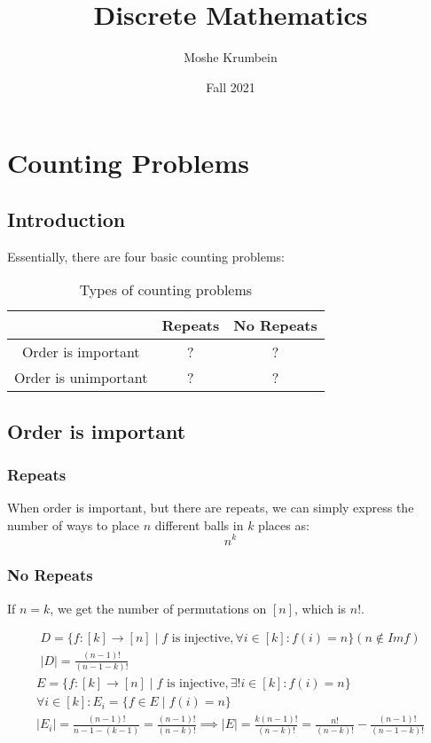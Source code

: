 \documentclass[00_complete]{subfiles}
\title{Discrete Mathematics}
\author{Moshe Krumbein}
\date{Fall 2021}
\begin{document}
\setcounter{chapter}{4}
\chapter{Counting Problems}

\section{Introduction}

Essentially, there are four basic counting problems:
\begin{table}[ht]
\centering
{\renewcommand{\arraystretch}{1.2}%
\begin{tabular}{ccc}
 \hline
& Repeats & No Repeats \\
 \hline
    Order is important & ?&? \\
    Order is unimportant & ?&? \\
 \hline
\end{tabular}}
\caption{Types of counting problems}
\end{table}

\section{Order is important}
\subsection{Repeats}
When order is important, but there are repeats, we can simply express the
number of ways to place $n$ different balls in $k$ places as:
$$n^k$$
\subsection{No Repeats}

If $n=k$, we get the number of permutations on $[n]$, which is $n!$.

$$
\begin{gathered}
    D=\{f:[k]\to[n] \mid f \text{ is injective}, \forall i \in [k]: f(i)=n\} (n
    \notin Imf) \\
    |D|= \frac{(n-1)!}{(n-1-k)!}
\end{gathered}
$$
$$
\begin{gathered}
    E=\{f:[k]\to[n] \mid f \text{ is injective}, \exists! i \in [k]: f(i)=n\}
    \\
    \forall i \in[k]: E_i = \{f \in E \mid f(i) = n \} \\
    |E_i| =\frac{(n-1)!}{n-1-(k-1)} = \frac{(n-1)!}{(n-k)!} \implies |E| = \frac{k(n-1)!}{(n-k)!}
    = \frac{n!}{(n-k)!} - \frac{(n-1)!}{(n-1-k)!}
\end{gathered}
$$
\end{document}
